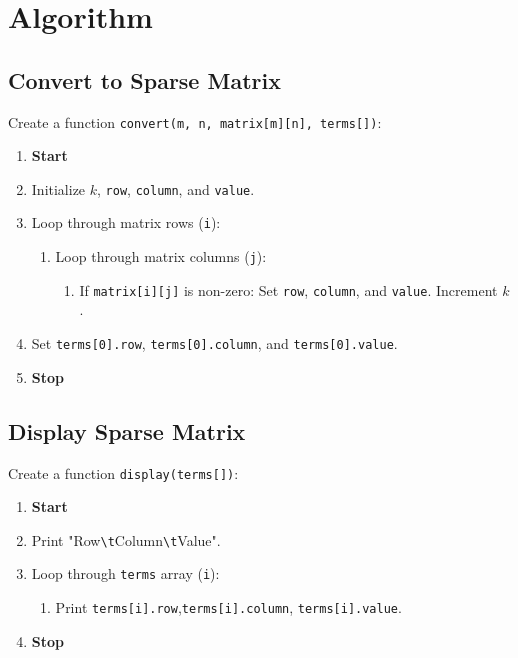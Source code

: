 
\section{Algorithm}

\subsection{Convert to Sparse Matrix}
  Create a function \texttt{convert(m, n, matrix[m][n], terms[])}:
    \begin{enumerate}
    \item \textbf{Start}
      \item Initialize $k$, \texttt{row}, \texttt{column}, and \texttt{value}.
      \item Loop through matrix rows (\texttt{i}):
        \begin{enumerate}[label=2.\arabic*:]
          \item Loop through matrix columns (\texttt{j}):
            \begin{enumerate}[label=2.1.\arabic*:]
              \item If \texttt{matrix[i][j]} is non-zero:
                  Set \texttt{row}, \texttt{column}, and \texttt{value}.
                  Increment $k$.
            \end{enumerate}
        \end{enumerate}
      \item Set \texttt{terms[0].row}, \texttt{terms[0].column}, and \texttt{terms[0].value}.
      \item \textbf{Stop}
    \end{enumerate}
    
\subsection{Display Sparse Matrix}
  Create a function \texttt{display(terms[])}:
    \begin{enumerate}
    \item \textbf{Start}
      \item Print "Row\texttt{\textbackslash t}Column\texttt{\textbackslash t}Value".
      \item Loop through \texttt{terms} array (\texttt{i}):
        \begin{enumerate}[label=3.\arabic*:]
          \item Print \texttt{terms[i].row},\texttt{terms[i].column}, \texttt{terms[i].value}.
        \end{enumerate}
    \item \textbf{Stop}
    \end{enumerate}


